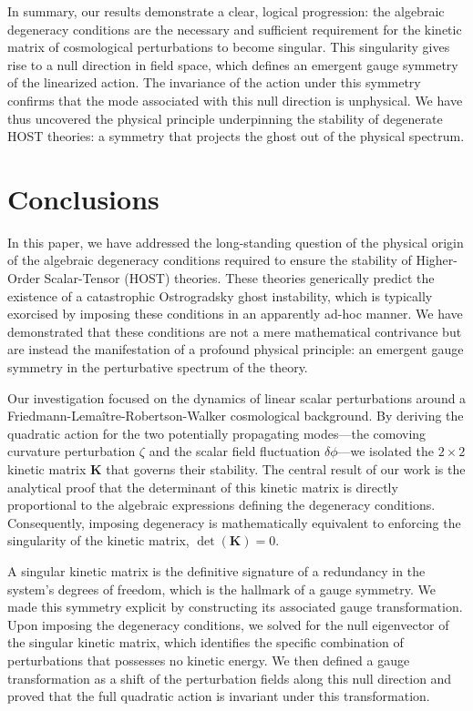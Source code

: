 \documentclass[twocolumn]{aastex631}
\begin{document}
In summary, our results demonstrate a clear, logical progression: the algebraic degeneracy conditions are the necessary and sufficient requirement for the kinetic matrix of cosmological perturbations to become singular. This singularity gives rise to a null direction in field space, which defines an emergent gauge symmetry of the linearized action. The invariance of the action under this symmetry confirms that the mode associated with this null direction is unphysical. We have thus uncovered the physical principle underpinning the stability of degenerate HOST theories: a symmetry that projects the ghost out of the physical spectrum.

\section{Conclusions}
\label{sec:conclusions}
In this paper, we have addressed the long-standing question of the physical origin of the algebraic degeneracy conditions required to ensure the stability of Higher-Order Scalar-Tensor (HOST) theories. These theories generically predict the existence of a catastrophic Ostrogradsky ghost instability, which is typically exorcised by imposing these conditions in an apparently ad-hoc manner. We have demonstrated that these conditions are not a mere mathematical contrivance but are instead the manifestation of a profound physical principle: an emergent gauge symmetry in the perturbative spectrum of the theory.

Our investigation focused on the dynamics of linear scalar perturbations around a Friedmann-Lema\^itre-Robertson-Walker cosmological background. By deriving the quadratic action for the two potentially propagating modes---the comoving curvature perturbation $\zeta$ and the scalar field fluctuation $\delta\phi$---we isolated the $2 \times 2$ kinetic matrix $\mathbf{K}$ that governs their stability. The central result of our work is the analytical proof that the determinant of this kinetic matrix is directly proportional to the algebraic expressions defining the degeneracy conditions. Consequently, imposing degeneracy is mathematically equivalent to enforcing the singularity of the kinetic matrix, $\det(\mathbf{K}) = 0$.

A singular kinetic matrix is the definitive signature of a redundancy in the system's degrees of freedom, which is the hallmark of a gauge symmetry. We made this symmetry explicit by constructing its associated gauge transformation. Upon imposing the degeneracy conditions, we solved for the null eigenvector of the singular kinetic matrix, which identifies the specific combination of perturbations that possesses no kinetic energy. We then defined a gauge transformation as a shift of the perturbation fields along this null direction and proved that the full quadratic action is invariant under this transformation.
\end{document}
